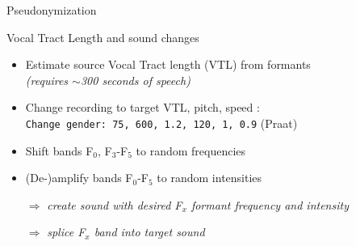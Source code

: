 \documentclass[xcolor={dvipsnames}]{beamer}
\begin{document}
\begin{frame}{Pseudonymization}

    \begin{figure}[htb]
        \centering
    \end{figure}

\end{frame}

\begin{frame}{Vocal Tract Length and sound changes}

\begin{itemize}
    \item Estimate source Vocal Tract length (VTL) from formants \cite{lammert_short-time_2015}\\
          \textit{(requires $\sim$300 seconds of speech)}
    \item Change recording to target VTL, pitch, speed \cite{boersma_praat:_2017}: \\
            {\texttt{Change gender: 75, 600, 1.2, 120, 1, 0.9}} \hfill (Praat)
    \item Shift bands F$_0$, F$_3$-F$_5$ to random frequencies
    \item (De-)amplify bands F$_0$-F$_5$ to random intensities
    \item[$\Rightarrow$] \textit{create sound with desired F$_x$ formant frequency and intensity}
    \item[$\Rightarrow$] \textit{splice F$_x$ band into target sound}
\end{itemize}

\let\thefootnote\relax{}
\end{frame}
\end{document}
